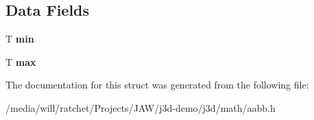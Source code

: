 \subsection*{Data Fields}
\begin{DoxyCompactItemize}
\item 
\hypertarget{structj3d_1_1aabb_a3e6d009ac4eea88d58c517d570e6f0fe}{}T {\bfseries min}\label{structj3d_1_1aabb_a3e6d009ac4eea88d58c517d570e6f0fe}

\item 
\hypertarget{structj3d_1_1aabb_adea255c8da2d6b7bc9e96cf86c1bff66}{}T {\bfseries max}\label{structj3d_1_1aabb_adea255c8da2d6b7bc9e96cf86c1bff66}

\end{DoxyCompactItemize}


The documentation for this struct was generated from the following file\+:\begin{DoxyCompactItemize}
\item 
/media/will/ratchet/\+Projects/\+J\+A\+W/j3d-\/demo/j3d/math/aabb.\+h\end{DoxyCompactItemize}
